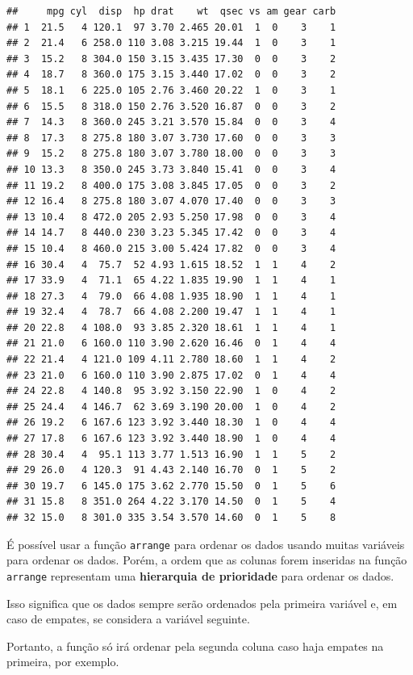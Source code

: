 \documentclass[
]{book}
\begin{document}
\begin{verbatim}
##     mpg cyl  disp  hp drat    wt  qsec vs am gear carb
## 1  21.5   4 120.1  97 3.70 2.465 20.01  1  0    3    1
## 2  21.4   6 258.0 110 3.08 3.215 19.44  1  0    3    1
## 3  15.2   8 304.0 150 3.15 3.435 17.30  0  0    3    2
## 4  18.7   8 360.0 175 3.15 3.440 17.02  0  0    3    2
## 5  18.1   6 225.0 105 2.76 3.460 20.22  1  0    3    1
## 6  15.5   8 318.0 150 2.76 3.520 16.87  0  0    3    2
## 7  14.3   8 360.0 245 3.21 3.570 15.84  0  0    3    4
## 8  17.3   8 275.8 180 3.07 3.730 17.60  0  0    3    3
## 9  15.2   8 275.8 180 3.07 3.780 18.00  0  0    3    3
## 10 13.3   8 350.0 245 3.73 3.840 15.41  0  0    3    4
## 11 19.2   8 400.0 175 3.08 3.845 17.05  0  0    3    2
## 12 16.4   8 275.8 180 3.07 4.070 17.40  0  0    3    3
## 13 10.4   8 472.0 205 2.93 5.250 17.98  0  0    3    4
## 14 14.7   8 440.0 230 3.23 5.345 17.42  0  0    3    4
## 15 10.4   8 460.0 215 3.00 5.424 17.82  0  0    3    4
## 16 30.4   4  75.7  52 4.93 1.615 18.52  1  1    4    2
## 17 33.9   4  71.1  65 4.22 1.835 19.90  1  1    4    1
## 18 27.3   4  79.0  66 4.08 1.935 18.90  1  1    4    1
## 19 32.4   4  78.7  66 4.08 2.200 19.47  1  1    4    1
## 20 22.8   4 108.0  93 3.85 2.320 18.61  1  1    4    1
## 21 21.0   6 160.0 110 3.90 2.620 16.46  0  1    4    4
## 22 21.4   4 121.0 109 4.11 2.780 18.60  1  1    4    2
## 23 21.0   6 160.0 110 3.90 2.875 17.02  0  1    4    4
## 24 22.8   4 140.8  95 3.92 3.150 22.90  1  0    4    2
## 25 24.4   4 146.7  62 3.69 3.190 20.00  1  0    4    2
## 26 19.2   6 167.6 123 3.92 3.440 18.30  1  0    4    4
## 27 17.8   6 167.6 123 3.92 3.440 18.90  1  0    4    4
## 28 30.4   4  95.1 113 3.77 1.513 16.90  1  1    5    2
## 29 26.0   4 120.3  91 4.43 2.140 16.70  0  1    5    2
## 30 19.7   6 145.0 175 3.62 2.770 15.50  0  1    5    6
## 31 15.8   8 351.0 264 4.22 3.170 14.50  0  1    5    4
## 32 15.0   8 301.0 335 3.54 3.570 14.60  0  1    5    8
\end{verbatim}

É possível usar a função \texttt{arrange} para ordenar os dados usando
muitas variáveis para ordenar os dados. Porém, a ordem que as colunas
forem inseridas na função \texttt{arrange} representam uma
\textbf{hierarquia de prioridade} para ordenar os dados.

Isso significa que os dados sempre serão ordenados pela primeira
variável e, em caso de empates, se considera a variável seguinte.

Portanto, a função só irá ordenar pela segunda coluna caso haja empates
na primeira, por exemplo.
\end{document}
